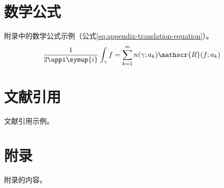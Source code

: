 \begin{translation}
\section{数学公式}

附录中的数学公式示例（公式\eqref{eq:appendix-translation-equation}）。
\begin{equation}
  \frac{1}{2 \uppi \symup{i}} \int_\gamma f = \sum_{k=1}^m n(\gamma; a_k) \mathscr{R}(f; a_k)
  \label{eq:appendix-translation-equation}
\end{equation}


\section{文献引用}

文献引用示例\cite{abrahams99tex}。


\appendix

\section{附录}

附录的内容。



%   
%   

\end{translation}
